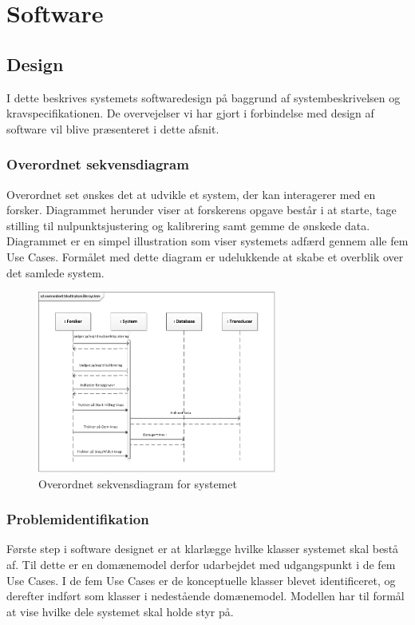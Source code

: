    
\section{Software}
\subsection{Design}
I dette beskrives systemets softwaredesign på baggrund af systembeskrivelsen og kravspecifikationen. De overvejelser vi har gjort i forbindelse med design af software vil blive præsenteret i dette afsnit. 

\subsubsection{Overordnet sekvensdiagram}
Overordnet set ønskes det at udvikle et system, der kan interagerer med en forsker. Diagrammet herunder viser at forskerens opgave består i at starte, tage stilling til nulpunktsjustering og kalibrering samt gemme de ønskede data. Diagrammet er en simpel illustration som viser systemets adfærd gennem alle fem Use Cases. Formålet med dette diagram er udelukkende at skabe et overblik over det samlede system.

\begin{figure}[H]
	\centering
	\includegraphics[width=0.7\textwidth]{Figurer/OverordnetSD}
	\caption{Overordnet sekvensdiagram for systemet}
\end{figure}

\subsubsection{Problemidentifikation}
Første step i software designet er at klarlægge hvilke klasser systemet skal bestå af. Til dette er en domænemodel derfor udarbejdet med udgangspunkt i de fem Use Cases. I de fem Use Cases er de konceptuelle klasser blevet identificeret, og derefter indført som klasser i nedestående domænemodel. Modellen har til formål at vise hvilke dele systemet skal holde styr på. 


